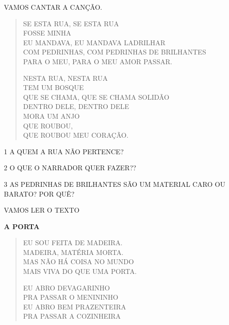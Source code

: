 

VAMOS CANTAR A CANÇÃO.

\begin{verse}
SE ESTA RUA, SE ESTA RUA\\
FOSSE MINHA\\
EU MANDAVA, EU MANDAVA LADRILHAR\\
COM PEDRINHAS, COM PEDRINHAS DE BRILHANTES\\
PARA O MEU, PARA O MEU AMOR PASSAR.

NESTA RUA, NESTA RUA\\
TEM UM BOSQUE\\
QUE SE CHAMA, QUE SE CHAMA SOLIDÃO\\
DENTRO DELE, DENTRO DELE\\
MORA UM ANJO\\
QUE ROUBOU,\\
QUE ROUBOU MEU CORAÇÃO.
\end{verse}


\num{1} A QUEM A RUA NÃO PERTENCE?


\num{2} O QUE O NARRADOR QUER FAZER??


\num{3} AS PEDRINHAS DE BRILHANTES SÃO UM MATERIAL CARO OU BARATO? POR QUÊ?


VAMOS LER O TEXTO

\textbf{A PORTA}

\begin{verse}
EU SOU FEITA DE MADEIRA.\\
MADEIRA, MATÉRIA MORTA.\\
MAS NÃO HÁ COISA NO MUNDO\\
MAIS VIVA DO QUE UMA PORTA.

EU ABRO DEVAGARINHO\\
PRA PASSAR O MENININHO\\
EU ABRO BEM PRAZENTEIRA\\
PRA PASSAR A COZINHEIRA
\end{verse}

